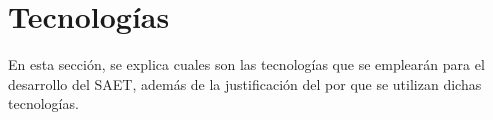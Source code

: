 \section{Tecnologías}
En esta sección, se explica cuales son las tecnologías que se emplearán para el desarrollo del SAET, además de la justificación del por que se utilizan dichas tecnologías.


